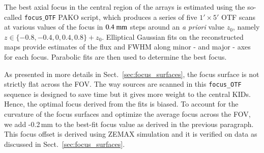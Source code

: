 The best axial focus in the central region of the arrays is estimated using the
so-called {\tt focus$\_$OTF} PAKO script, which produces a series of
five $1'\times 5'$ OTF scans at various values of the focus in $0.4~\rm{mm}$ steps
around an \emph{a priori} value $z_0$, namely
$z \in \{-0.8, -0.4, 0, 0.4, 0.8\} + z_0$.
Elliptical Gaussian fits on the reconstructed maps provide estimates of
the flux and FWHM along minor - and major - axes for each focus. Parabolic fits are
then used to determine the best focus.

As presented in more details in Sect.~\ref{sec:focus_surfaces}, the focus
surface is not strictly flat across the FOV. The way sources are scanned in
this {\tt focus\_OTF} sequence is designed to save time but it gives more weight
to the central KIDs. Hence, the optimal focus derived from the fits is
biased. To account for the curvature of the focus surfaces and optimize the
average focus across the FOV, we add -0.2\,mm to the best-fit focus value as derived
in the previous paragraph. This focus offset is derived using ZEMAX
simulation and it is verified on data as discussed in
Sect.~\ref{sec:focus_surfaces}.


